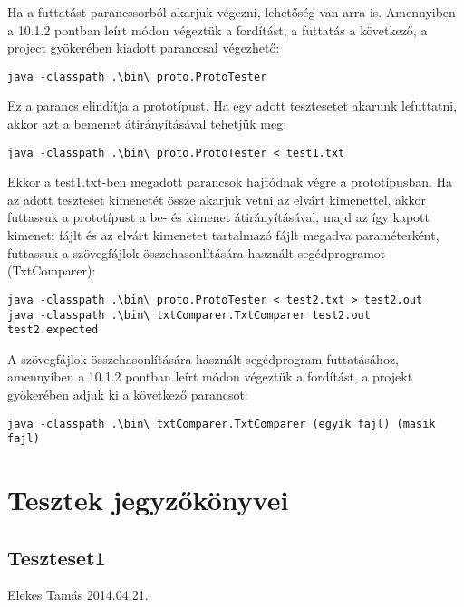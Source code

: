 Ha a futtatást parancssorból akarjuk végezni, lehetőség van arra is. Amennyiben a 10.1.2 pontban leírt módon végeztük a fordítást, a futtatás a következő, a project gyökerében kiadott paranccsal végezhető:

\begin{lstlisting}
java -classpath .\bin\ proto.ProtoTester
\end{lstlisting}
Ez a parancs elindítja a prototípust.
Ha egy adott tesztesetet akarunk lefuttatni, akkor azt a bemenet átirányításával tehetjük meg:
\begin{lstlisting}
java -classpath .\bin\ proto.ProtoTester < test1.txt
\end{lstlisting}
Ekkor a test1.txt-ben megadott parancsok hajtódnak végre a prototípusban.
Ha az adott teszteset kimenetét össze akarjuk vetni az elvárt kimenettel, akkor futtassuk a prototípust a be- és kimenet átirányításával, majd az így kapott kimeneti fájlt és az elvárt kimenetet tartalmazó fájlt megadva paraméterként, futtassuk a szövegfájlok összehasonlítására használt segédprogramot (TxtComparer):
\begin{lstlisting}
java -classpath .\bin\ proto.ProtoTester < test2.txt > test2.out
java -classpath .\bin\ txtComparer.TxtComparer test2.out test2.expected
\end{lstlisting}

A szövegfájlok összehasonlítására használt segédprogram futtatásához, amennyiben a 10.1.2 pontban leírt módon végeztük a fordítást, a projekt gyökerében adjuk ki a következő parancsot:
\begin{lstlisting}
java -classpath .\bin\ txtComparer.TxtComparer (egyik fajl) (masik fajl)
\end{lstlisting}

\section{Tesztek jegyzőkönyvei}

\subsection{Teszteset1}

\tesztok
{Elekes Tamás}
{2014.04.21.}

